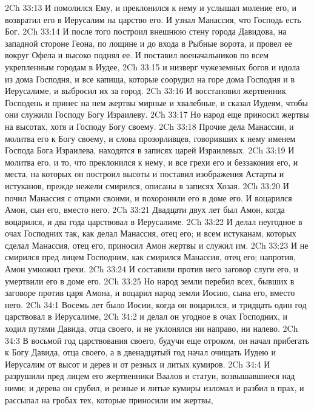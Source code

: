 \vs 2Ch 33:13 И помолился Ему, и  преклонился к нему и услышал моление его, и возвратил его в Иерусалим на царство его. И узнал Манассия, что Господь есть Бог.
\vs 2Ch 33:14 И после того построил внешнюю стену города Давидова, на западной стороне Геона, по лощине и до входа в Рыбные ворота, и провел ее вокруг Офела и высоко поднял ее. И поставил военачальников по всем укрепленным городам в Иудее,
\vs 2Ch 33:15 и низверг чужеземных богов и идола из дома Господня, и все капища, которые соорудил на горе дома Господня и в Иерусалиме, и выбросил их за город.
\vs 2Ch 33:16 И восстановил жертвенник Господень и принес на нем жертвы мирные и хвалебные, и сказал Иудеям, чтобы они служили Господу Богу Израилеву.
\vs 2Ch 33:17 Но народ еще приносил жертвы на высотах, хотя и Господу Богу своему.
\rsbpar\vs 2Ch 33:18 Прочие дела Манассии, и молитва его к Богу своему, и слова прозорливцев, говоривших к нему именем Господа Бога Израилева, находятся в записях царей Израилевых.
\vs 2Ch 33:19 И молитва его, и то, что  преклонился к нему, и все грехи его и беззакония его, и места, на которых он построил высоты и поставил изображения Астарты и истуканов, прежде нежели смирился, описаны в записях Хозая.
\vs 2Ch 33:20 И почил Манассия с отцами своими, и похоронили его в доме его. И воцарился Амон, сын его, вместо него.
\rsbpar\vs 2Ch 33:21 Двадцати двух лет был Амон, когда воцарился, и два года царствовал в Иерусалиме.
\vs 2Ch 33:22 И делал неугодное в очах Господних так, как делал Манассия, отец его; и всем истуканам, которых сделал Манассия, отец его, приносил Амон жертвы и служил им.
\vs 2Ch 33:23 И не смирился пред лицем Господним, как смирился Манассия, отец его; напротив, Амон умножил  грехи.
\vs 2Ch 33:24 И составили против него заговор слуги его, и умертвили его в доме его.
\vs 2Ch 33:25 Но народ земли перебил всех, бывших в заговоре против царя Амона, и воцарил народ земли Иосию, сына его, вместо него.
\vs 2Ch 34:1 Восемь лет было Иосии, когда он воцарился, и тридцать один год царствовал в Иерусалиме,
\vs 2Ch 34:2 и делал он угодное в очах Господних, и ходил путями Давида, отца своего, и не уклонялся ни направо, ни налево.
\rsbpar\vs 2Ch 34:3 В восьмой год царствования своего, будучи еще отроком, он начал прибегать к Богу Давида, отца своего, а в двенадцатый год начал очищать Иудею и Иерусалим от высот и  дерев и от резных и литых кумиров.
\vs 2Ch 34:4 И разрушили пред лицем его жертвенники Ваалов и статуи, возвышавшиеся над ними; и  дерева он срубил, и резные и литые кумиры изломал и разбил в прах, и рассыпал на гробах тех, которые приносили им жертвы,
